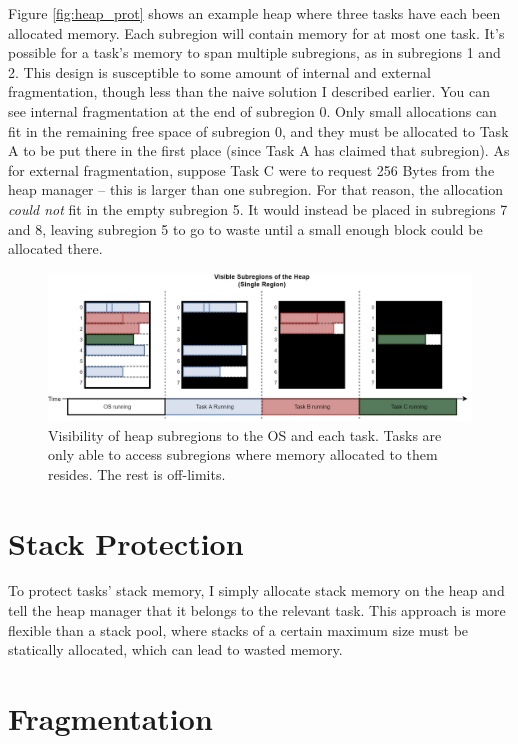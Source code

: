 Figure \ref{fig:heap_prot} shows an example heap where three tasks have each been allocated memory. Each subregion will contain memory for at most one task. It's possible for a task's memory to span multiple subregions, as in subregions 1 and 2. This design is susceptible to some amount of internal and external fragmentation, though less than the naive solution I described earlier. You can see internal fragmentation at the end of subregion 0. Only small allocations can fit in the remaining free space of subregion 0, and they must be allocated to Task A to be put there in the first place (since Task A has claimed that subregion). As for external fragmentation, suppose Task C were to request 256 Bytes from the heap manager -- this is larger than one subregion. For that reason, the allocation \textit{could not} fit in the empty subregion 5. It would instead be placed in subregions 7 and 8, leaving subregion 5 to go to waste until a small enough block could be allocated there.

\begin{figure}[hbtp]
	\centering
	\includegraphics[width=\linewidth]{figs/heap_over_time.png}
	\caption{Visibility of heap subregions to the OS and each task. Tasks are only able to access subregions where memory allocated to them resides. The rest is off-limits.}
	\label{fig:heap_over_time}
\end{figure}

\section{Stack Protection}

To protect tasks' stack memory, I simply allocate stack memory on the heap and tell the heap manager that it belongs to the relevant task. This approach is more flexible than a stack pool, where stacks of a certain maximum size must be statically allocated, which can lead to wasted memory.

\section{Fragmentation}

